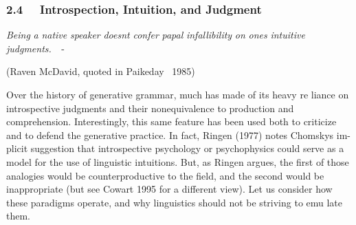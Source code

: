 \subsubsection[2.4 \ \ Introspection, Intuition, and Judgment]{2.4 \ \ Introspection, Intuition, and Judgment}
\begin{styleStandard}
\textit{Being}\textit{ }\textit{a}\textit{ }\textit{native}\textit{ }\textit{speaker}\textit{ }\textit{doesn{\textquotesingle}t}\textit{ }\textit{confer}\textit{ }\textit{papal}\textit{ }\textit{infallibility}\textit{ }\textit{on}\textit{ }\textit{one{\textquotesingle}s}\textit{ }\textit{intuitive}\textit{ }\textit{judgments.\ \ }{}-
\end{styleStandard}


\begin{styleStandard}
(Raven McDavid, quoted in Paikeday \ 1985)
\end{styleStandard}


\begin{styleStandard}
Over the history of generative grammar, much has made of its heavy re\- liance on introspective judgments and their nonequivalence to production and comprehension. Interestingly, this same feature has been used both to criticize and to defend the generative practice. In fact, Ringen (1977) notes Chomsky{\textquotesingle}s im- plicit suggestion that introspective psychology or psychophysics could serve as a model for the use of linguistic intuitions. But, as Ringen argues, the first of those analogies would be counterproductive to the field, and the second would be inappropriate (but see Cowart 1995 for a different view). Let us consider how these paradigms operate, and why linguistics should not be striving to emu\- late them.
\end{styleStandard}


